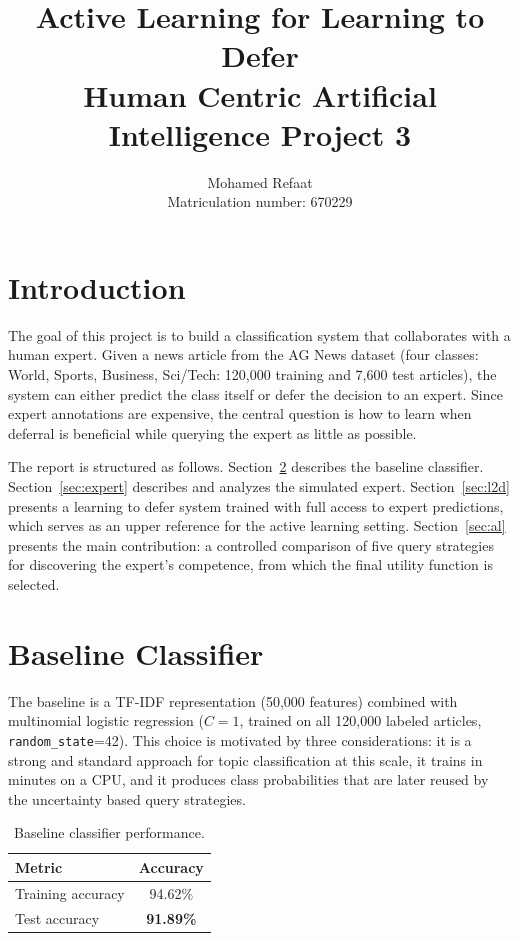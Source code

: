 \documentclass[11pt]{article}
\title{Active Learning for Learning to Defer\\\large Human Centric Artificial Intelligence Project 3}
\author{Mohamed Refaat\\Matriculation number: 670229}
\date{}
\begin{document}
\maketitle

\section{Introduction}
The goal of this project is to build a classification system that collaborates with a human expert. Given a news article from the AG News dataset (four classes: World, Sports, Business, Sci/Tech: 120{,}000 training and 7{,}600 test articles), the system can either predict the class itself or defer the decision to an expert. Since expert annotations are expensive, the central question is how to learn when deferral is beneficial while querying the expert as little as possible.

The report is structured as follows. Section~\ref{sec:baseline} describes the baseline classifier. Section~\ref{sec:expert} describes and analyzes the simulated expert. Section~\ref{sec:l2d} presents a learning to defer system trained with full access to expert predictions, which serves as an upper reference for the active learning setting. Section~\ref{sec:al} presents the main contribution: a controlled comparison of five query strategies for discovering the expert's competence, from which the final utility function is selected.

\section{Baseline Classifier}
\label{sec:baseline}
The baseline is a TF-IDF representation (50{,}000 features) combined with multinomial logistic regression ($C=1$, trained on all 120{,}000 labeled articles, \texttt{random\_state}=42). This choice is motivated by three considerations: it is a strong and standard approach for topic classification at this scale, it trains in minutes on a CPU, and it produces class probabilities that are later reused by the uncertainty based query strategies.

\begin{table}[H]
\centering
\begin{tabular}{lc}
\toprule
Metric & Accuracy \\
\midrule
Training accuracy & 94.62\% \\
Test accuracy & \textbf{91.89\%} \\
\bottomrule
\end{tabular}
\caption{Baseline classifier performance.}
\end{table}
\end{document}
